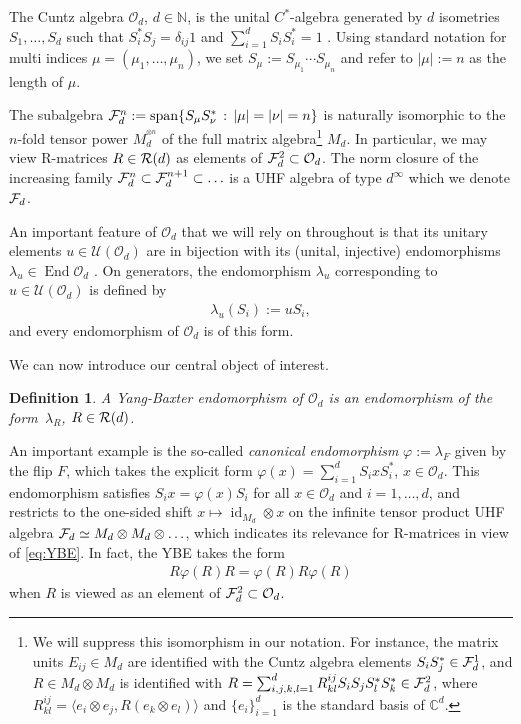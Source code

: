 \documentclass[12pt,a4paper]{amsart}
\numberwithin{equation}{section}
\newtheorem{definition}[theorem]{Definition}
\theoremstyle{remark}
\def\End{\operatorname{End}}
\def\newspan{\operatorname{span}}
\def\id{\operatorname{id}}
\def\id{\operatorname{id}}
\newcommand{\ot}{\otimes}
\newcommand{\tp}[1]{^{\otimes #1}}    %
\newcommand{\Cl}{\mathbb{C}}
\newcommand{\Nl}{\mathbb{N}}
\newcommand{\la}{\lambda}
\newcommand{\CO}[0]{\mathcal{O}} \newcommand{\CP}[0]{\mathcal{P}}
\newcommand{\CU}[0]{\mathcal{U}} \newcommand{\CV}[0]{\mathcal{V}}
\begin{document}
\medskip

The Cuntz algebra $\CO_d$, $d\in\Nl$, is the unital $C^*$-algebra generated by $d$ isometries $S_1,\ldots,S_d$ such that $S_i^*S_j=\delta_{ij}1$ and $\sum_{i=1}^dS_iS_i^*=1$ \cite{Cuntz:1977}. Using standard notation for multi indices $\mu = (\mu_1,\ldots,\mu_n)$, we set $S_\mu:=S_{\mu_1} \cdots S_{\mu_n}$ and refer to $|\mu|:=n$ as the length of $\mu$.

The subalgebra $\CF_d^n:=\newspan\{S_\mu S_\nu^*\,:\,|\mu|=|\nu|=n\}$ is naturally isomorphic to the $n$-fold tensor power $M_d^{\tp n}$ of the full matrix algebra\footnote{We will suppress this isomorphism in our notation. For instance, the matrix units $E_{ij}\in M_d$ are identified with the Cuntz algebra elements $S_iS_j^*\in\mathcal{F}_d^1$, and $R\in M_d\ot M_d$ is identified with $R=\sum_{i,j,k,l=1}^dR^{ij}_{kl}S_iS_jS_l^*S_k^*\in\mathcal{F}_d^2$, where $R^{ij}_{kl}=\langle e_i\ot e_j,R(e_k\ot e_l)\rangle$ and $\{e_i\}_{i=1}^d$ is the standard basis of $\Cl^d$.} $M_d$. In particular, we may view R-matrices $R\in\mathcal{R}(d)$ as elements of $\CF_d^2\subset\CO_d$. The norm closure of the increasing family $\mathcal{F}_d^n\subset\mathcal{F}_d^{n+1}\subset\ldots$ is a UHF algebra of type $d^\infty$ which we denote $\mathcal{F}_d$.

An important feature of $\CO_d$ that we will rely on throughout is that its unitary elements $u\in\CU(\CO_d)$ are in bijection with its (unital, injective) endomorphisms $\la_u\in\End\CO_d$ \cite{Cuntz:1980}. On generators, the endomorphism $\la_u$ corresponding to $u\in\CU(\CO_d)$ is defined by
\begin{align*}
 \la_u(S_i):=uS_i,
 \end{align*}
and every endomorphism of $\CO_d$ is of this form. 

We can now introduce our central object of interest.

\begin{definition}
    A {\em Yang-Baxter endomorphism of $\CO_d$} is an endomorphism of the form~$\la_R$, $R\in\mathcal{R}(d)$.
\end{definition}

An important example is the so-called {\em canonical endomorphism} $\varphi:=\la_F$ given by the flip $F$, which takes the explicit form $\varphi(x)=\sum_{i=1}^d S_i x S_i^*$, $x\in\CO_d$. This endomorphism satisfies $S_i x = \varphi(x) S_i$ for all $x \in \CO_d$ and $i=1,\ldots,d$,  and restricts to the one-sided shift $x\mapsto\id_{M_d}\ot x$ on the infinite tensor product UHF algebra $\mathcal{F}_d \simeq M_d \otimes M_d \otimes \ldots$, which indicates its relevance for R-matrices in view of \eqref{eq:YBE}. In fact, the YBE takes the form 
\begin{align}\label{eq:YBE-Cuntz-Form}
    R\varphi(R)R=\varphi(R)R\varphi(R)
\end{align}
when $R$ is viewed as an element of $\CF_d^2\subset\CO_d$.
\end{document}
